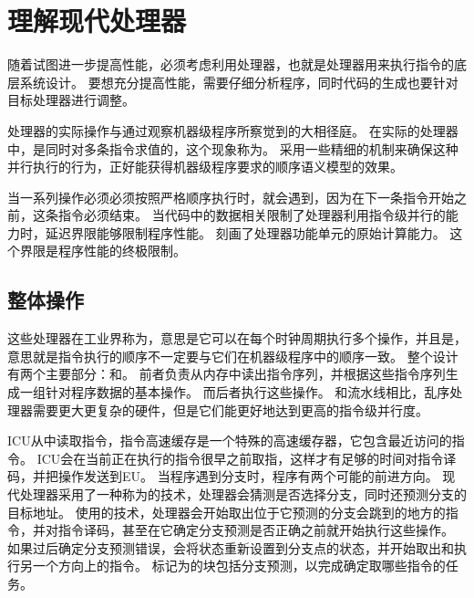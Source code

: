 
\section{理解现代处理器}
{
    随着试图进一步提高性能，必须考虑利用处理器，也就是处理器用来执行指令的底层系统设计。
    要想充分提高性能，需要仔细分析程序，同时代码的生成也要针对目标处理器进行调整。

    处理器的实际操作与通过观察机器级程序所察觉到的大相径庭。
    在实际的处理器中，是同时对多条指令求值的，这个现象称为。
    采用一些精细的机制来确保这种并行执行的行为，正好能获得机器级程序要求的顺序语义模型的效果。

    当一系列操作必须必须按照严格顺序执行时，就会遇到，因为在下一条指令开始之前，这条指令必须结束。
    当代码中的数据相关限制了处理器利用指令级并行的能力时，延迟界限能够限制程序性能。
    刻画了处理器功能单元的原始计算能力。
    这个界限是程序性能的终极限制。

    \subsection{整体操作}
    {
        这些处理器在工业界称为，意思是它可以在每个时钟周期执行多个操作，并且是，意思就是指令执行的顺序不一定要与它们在机器级程序中的顺序一致。
        整个设计有两个主要部分：和。
        前者负责从内存中读出指令序列，并根据这些指令序列生成一组针对程序数据的基本操作。
        而后者执行这些操作。
        和流水线相比，乱序处理器需要更大更复杂的硬件，但是它们能更好地达到更高的指令级并行度。

        ICU从中读取指令，指令高速缓存是一个特殊的高速缓存器，它包含最近访问的指令。
        ICU会在当前正在执行的指令很早之前取指，这样才有足够的时间对指令译码，并把操作发送到EU。
        当程序遇到分支时，程序有两个可能的前进方向。
        现代处理器采用了一种称为的技术，处理器会猜测是否选择分支，同时还预测分支的目标地址。
        使用的技术，处理器会开始取出位于它预测的分支会跳到的地方的指令，并对指令译码，甚至在它确定分支预测是否正确之前就开始执行这些操作。
        如果过后确定分支预测错误，会将状态重新设置到分支点的状态，并开始取出和执行另一个方向上的指令。
        标记为的块包括分支预测，以完成确定取哪些指令的任务。

}}
